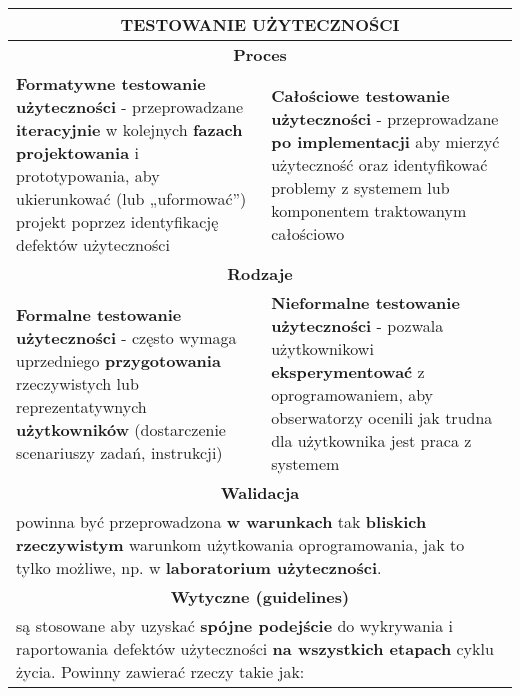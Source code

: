 \documentclass[../main.tex]{subfiles}
\begin{document}
    \begin{table}[H]
        \begin{center}
            \begin{tabular}{| p{8cm} | p{8cm} |}
                \hline
                \multicolumn{2}{|c|}{\textbf{TESTOWANIE UŻYTECZNOŚCI}} \\
                \hline
                \hline
                \multicolumn{2}{|c|}{\textbf{Proces}} \\
                \hline
                \textbf{Formatywne testowanie użyteczności} - przeprowadzane \textbf{iteracyjnie} w
                kolejnych \textbf{fazach projektowania} i prototypowania, aby ukierunkować
                (lub „uformować”) projekt poprzez identyfikację defektów użyteczności

                &
                \textbf{Całościowe testowanie użyteczności} - przeprowadzane \textbf{po implementacji}
                aby mierzyć użyteczność oraz identyfikować problemy z systemem
                lub komponentem traktowanym całościowo
                \\
                \hline
                \hline
                \multicolumn{2}{|c|}{\textbf{Rodzaje}} \\
                \hline
                \textbf{Formalne testowanie użyteczności} - często wymaga uprzedniego \textbf{przygotowania} rzeczywistych
                lub reprezentatywnych \textbf{użytkowników} (dostarczenie scenariuszy zadań, instrukcji)
                &
                \textbf{Nieformalne testowanie użyteczności} - pozwala użytkownikowi \textbf{eksperymentować} z
                oprogramowaniem, aby obserwatorzy ocenili jak trudna dla użytkownika jest praca z systemem \\
                \hline
                \hline
                \multicolumn{2}{|c|}{\textbf{Walidacja}} \\
                \hline
                \multicolumn{2}{|p{16cm}|}{powinna być przeprowadzona \textbf{w warunkach} tak \textbf{bliskich rzeczywistym} warunkom użytkowania
                oprogramowania, jak to tylko możliwe, np. w \textbf{laboratorium użyteczności}.} \\
                \hline
                \hline
                \multicolumn{2}{|c|}{\textbf{Wytyczne (guidelines)}} \\
                \hline
                \multicolumn{2}{|p{16cm}|}{są stosowane aby uzyskać \textbf{spójne podejście} do wykrywania i raportowania defektów
                użyteczności \textbf{na wszystkich etapach} cyklu życia. Powinny zawierać rzeczy takie jak:} \\

\end{tabular}
\end{center}
\end{table}
\end{document}
